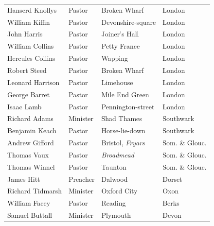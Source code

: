 \documentclass[
    paper=letterpaper,
    11pt,
    twoside,
    DIV=calc,
    openany
]{scrbook}
\begin{document}
\begin{table}[H]
\begin{tabular}{llll}
Hanserd Knollys                      & Pastor   & Broken Wharf                & London         \\
William Kiffin                       & Pastor   & Devonshire-square           & London         \\
John Harris                          & Pastor   & Joiner's Hall               & London         \\
William Collins                      & Pastor   & Petty France                & London         \\
Hercules Collins                     & Pastor   & Wapping                     & London         \\
Robert Steed                         & Pastor   & Broken Wharf                & London         \\
Leonard Harrison                     & Pastor   & Limehouse                   & London         \\
George Barret                        & Pastor   & Mile End Green              & London         \\
Isaac Lamb                           & Pastor   & Pennington-street           & London         \\
Richard Adams                        & Minister & Shad Thames                 & Southwark      \\
Benjamin Keach                       & Pastor   & Horse-lie-down              & Southwark      \\
Andrew Gifford                       & Pastor   & Bristol, \textit{Fryars}    & Som. \& Glouc. \\
Thomas Vaux                          & Pastor   &          \textit{Broadmead} & Som. \& Glouc. \\
Thomas Winnel                        & Pastor   & Taunton                     & Som. \& Glouc. \\
James Hitt                           & Preacher & Dalwood                     & Dorset         \\
Richard Tidmarsh                     & Minister & Oxford City                 & Oxon           \\
William Facey                        & Pastor   & Reading                     & Berks          \\
Samuel Buttall                       & Minister & Plymouth                    & Devon          \\

\end{tabular}
\end{table}
\end{document}
